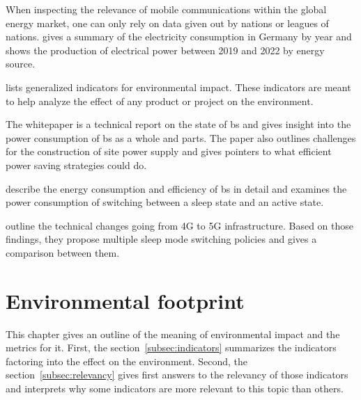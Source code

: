 \documentclass[11pt,a4paper]{article}
\begin{document}
When inspecting the relevance of mobile communications within the global energy market, one can only rely on data given out by nations or leagues of nations.
\citep{Stromverbrauch} gives a summary of the electricity consumption in Germany by year and \citep{Bruttostromerzeugung} shows the production of electrical power between 2019 and 2022 by energy source.

\citep{Umweltindikatoren} lists generalized indicators for environmental impact.
These indicators are meant to help analyze the effect of any product or project on the environment.

The whitepaper \citep{powerwhitepaper} is a technical report on the state of \acrfull{bs} and gives insight into the power consumption of \acrshort{bs} as a whole and parts.
The paper also outlines challenges for the construction of site power supply and gives pointers to what efficient power saving strategies could do.

\citep{5GEfficiencyOverview} describe the energy consumption and efficiency of \acrshort{bs} in detail and examines the power consumption of switching between a sleep state and an active state.

\citep{DynamicSleepModeControl} outline the technical changes going from 4G to 5G infrastructure.
Based on those findings, they propose multiple sleep mode switching policies and gives a comparison between them.

\section{Environmental footprint}\label{sec:energyfootprint}
This chapter gives an outline of the meaning of environmental impact and the metrics for it.
First, the section~\ref{subsec:indicators} summarizes the indicators factoring into the effect on the environment.
Second, the section~\ref{subsec:relevancy} gives first answers to the relevancy of those indicators and interprets why some indicators are more relevant to this topic than others.
\end{document}
